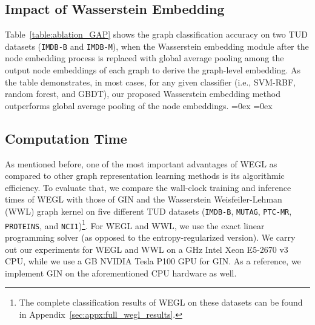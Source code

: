 \documentclass[table]{article} \usepackage{iclr2021_conference,times}
\begin{document}
\subsection{Impact of Wasserstein Embedding}
Table~\ref{table:ablation_GAP} shows the graph classification accuracy on two TUD datasets (\texttt{IMDB-B} and \texttt{IMDB-M}), when the Wasserstein embedding module after the node embedding process is replaced with global average pooling among the output node embeddings of each graph to derive the graph-level embedding. As the table demonstrates, in most cases, for any given classifier (i.e., SVM-RBF, random forest, and GBDT), our proposed Wasserstein embedding method outperforms global average pooling of the node embeddings.
\aboverulesep=0ex
\belowrulesep=0ex
\begin{table}[t!]
\scriptsize
\centering
\noindent{}
\vspace{.1in}
\caption{Ablation study on the graph classification accuracy (\%) of Wasserstein embedding vs simple global average pooling on \texttt{IMDB-B} and \texttt{IMDB-M} datasets.}
\label{table:ablation_GAP}
\end{table}
\fi


\subsection{Computation Time}
As mentioned before, one of the most important advantages of WEGL as compared to other graph representation learning methods is its algorithmic efficiency. To evaluate that, we compare the wall-clock training and inference times of WEGL with those of GIN and the Wasserstein Weisfeiler-Lehman (WWL) graph kernel on five different TUD datasets (\texttt{IMDB-B}, \texttt{MUTAG}, \texttt{PTC-MR}, \texttt{PROTEINS}, and \texttt{NCI1})\footnote{The complete classification results of WEGL on these datasets can be found in Appendix~\ref{sec:appx:full_wegl_results}.}. For WEGL and WWL, we use the exact linear programming solver (as opposed to the entropy-regularized version). We carry out our experiments for WEGL and WWL on a  GHz Intel\textsuperscript{\tiny \textregistered} Xeon\textsuperscript{\tiny \textregistered} E5-2670 v3 CPU, while we use a  GB NVIDIA\textsuperscript{\tiny \textregistered} Tesla\textsuperscript{\tiny \textregistered} P100 GPU for GIN. As a reference, we implement GIN on the aforementioned CPU hardware as well.
\end{document}
